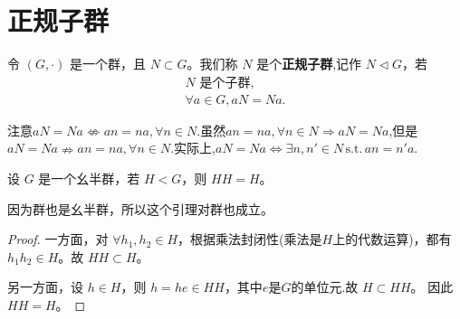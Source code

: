 \documentclass[../../main.tex]{subfiles}
\begin{document}
\section{正规子群}

\begin{definition}[正规子群]
令 $(G,\cdot)$ 是一个群，且 $N\subset G$。我们称 $N$ 是个\textbf{正规子群},记作 $N\lhd G$，若
\begin{gather*}
N\text{ 是个子群},\\
\forall a\in G, aN = Na.
\end{gather*}
\end{definition}
\begin{remark}
注意$aN=Na\nLeftrightarrow an=na,\forall n\in N.$虽然$an=na,\forall n\in N\Rightarrow aN=Na$,但是$aN=Na\nRightarrow an=na,\forall n\in N.$实际上,$aN=Na\Leftrightarrow \exists n,n' \in N\,\mathrm{s}.\mathrm{t}.\,an=n'a.$
\end{remark}

\begin{lemma}\label{lemma:子群或子幺半群与自身的乘积还等于其本身}
设 $G$ 是一个幺半群，若 $H < G$，则 $HH = H$。
\end{lemma}
\begin{note}
因为群也是幺半群，所以这个引理对群也成立。
\end{note}
\begin{proof}
一方面，对 $\forall h_1,h_2\in H$，根据乘法封闭性(乘法是$H$上的代数运算)，都有 $h_1h_2\in H$。故 $HH\subset H$。

另一方面，设 $h\in H$，则 $h = he\in HH$，其中$e$是$G$的单位元.故 $H\subset HH$。
因此 $HH = H$。 
\end{proof}
\end{document}
